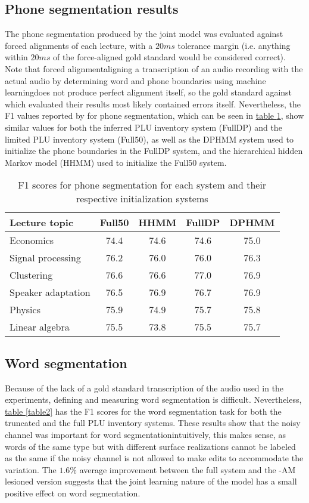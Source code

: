 \documentclass[12pt,letterpaper]{article}
\begin{document}
\subsection{Phone segmentation results}
The phone segmentation produced by the joint model was evaluated against forced alignments of each lecture, with a $20ms$ tolerance margin (i.e. anything within $20ms$ of the force-aligned gold standard would be considered correct). Note that forced alignment\textemdash aligning a transcription of an audio recording with the actual audio by determining word and phone boundaries using machine learning\textemdash does not produce perfect alignment itself, so the gold standard against which \citet{lee:2015} evaluated their results most likely contained errors itself. Nevertheless, the F1 values reported by \citet{lee:2015} for phone segmentation, which can be seen in \hyperref[table1]{table \ref*{table1}}, show similar values for both the inferred PLU inventory system (FullDP) and the limited PLU inventory system (Full50), as well as the DPHMM system used to initialize the phone boundaries in the FullDP system, and the hierarchical hidden Markov model (HHMM) used to initialize the Full50 system. 
\begin{table}
\begin{tabular}{|l|c|c||c|c|}
\hline
Lecture topic&Full50&HHMM&FullDP&DPHMM\\
\hline \hline
Economics&74.4&74.6&74.6&75.0\\
\hline
Signal processing&76.2&76.0&76.0&76.3\\
\hline
Clustering&76.6&76.6&77.0&76.9\\
\hline
Speaker adaptation&76.5&76.9&76.7&76.9\\
\hline
Physics&75.9&74.9&75.7&75.8\\
\hline
Linear algebra&75.5&73.8&75.5&75.7\\
\hline

\end{tabular}
\caption{F1 scores for phone segmentation for each system and their respective initialization systems}
\label{table1}
\end{table}

\subsection{Word segmentation}
Because of the lack of a gold standard transcription of the audio used in the experiments, defining and measuring word segmentation is difficult. Nevertheless, \hyperref[table2]{table \ref*{table2}} has the F1 scores for the word segmentation task for both the truncated and the full PLU inventory systems. These results show that the noisy channel was important for word segmentation\textemdash intuitively, this makes sense, as words of the same type but with different surface realizations cannot be labeled as the same if the noisy channel is not allowed to make edits to accommodate the variation. The $1.6\%$ average improvement between the full system and the -AM lesioned version suggests that the joint learning nature of the model has a small positive effect on word segmentation.
\end{document}
